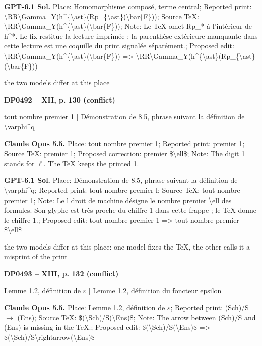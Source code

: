 \textbf{GPT-6.1 Sol.} Place: Homomorphisme composé, terme central; Reported print: \textbackslash{}RR\textbackslash{}Gamma\_Y(h\textasciicircum{}\{\textbackslash{}ast\}(Rp\_\{\textbackslash{}ast\}(\textbackslash{}bar\{F\})); Source TeX: \textbackslash{}RR\textbackslash{}Gamma\_Y(h\textasciicircum{}\{\textbackslash{}ast\}(\textbackslash{}bar\{F\})); Note: Le TeX omet Rp\_* à l'intérieur de h\textasciicircum{}*. Le fix restitue la lecture imprimée ; la parenthèse extérieure manquante dans cette lecture est une coquille du print signalée séparément.; Proposed edit: \textbackslash{}RR\textbackslash{}Gamma\_Y(h\textasciicircum{}\{\textbackslash{}ast\}(\textbackslash{}bar\{F\})) =\allowbreak > \textbackslash{}RR\textbackslash{}Gamma\_Y(h\textasciicircum{}\{\textbackslash{}ast\}(Rp\_\{\textbackslash{}ast\}(\textbackslash{}bar\{F\}))\par
the two models differ at this place\par
\par\noindent\hypertarget{DP0492}{}\textbf{DP0492 -- XII, p. 130 (conflict)}\par
tout nombre premier 1 | Démonstration de 8.5, phrase suivant la définition de \textbackslash{}varphi\textasciicircum{}q\par
\textbf{Claude Opus 5.5.} Place: tout nombre premier 1; Reported print: premier 1; Source TeX: premier 1; Proposed correction: premier \$\textbackslash{}ell\$; Note: The digit 1 stands for \ensuremath{\ell}. The TeX keeps the printed 1.\par
\textbf{GPT-6.1 Sol.} Place: Démonstration de 8.5, phrase suivant la définition de \textbackslash{}varphi\textasciicircum{}q; Reported print: tout nombre premier l; Source TeX: tout nombre premier 1; Note: Le l droit de machine désigne le nombre premier \textbackslash{}ell des formules. Son glyphe est très proche du chiffre 1 dans cette frappe ; le TeX donne le chiffre 1.; Proposed edit: tout nombre premier 1 =\allowbreak > tout nombre premier \$\textbackslash{}ell\$\par
the two models differ at this place: one model fixes the TeX, the other calls it a misprint of the print\par
\par\noindent\hypertarget{DP0493}{}\textbf{DP0493 -- XIII, p. 132 (conflict)}\par
Lemme 1.2, définition de \ensuremath{\varepsilon} | Lemme 1.2, définition du foncteur epsilon\par
\textbf{Claude Opus 5.5.} Place: Lemme 1.2, définition de \ensuremath{\varepsilon}; Reported print: (Sch)/S \ensuremath{\longrightarrow} (Ens); Source TeX: \$(\textbackslash{}Sch)/S(\textbackslash{}Ens)\$; Note: The arrow between (Sch)/S and (Ens) is missing in the TeX.; Proposed edit: \$(\textbackslash{}Sch)/S(\textbackslash{}Ens)\$ =\allowbreak > \$(\textbackslash{}Sch)/S\textbackslash{}rightarrow(\textbackslash{}Ens)\$\par
